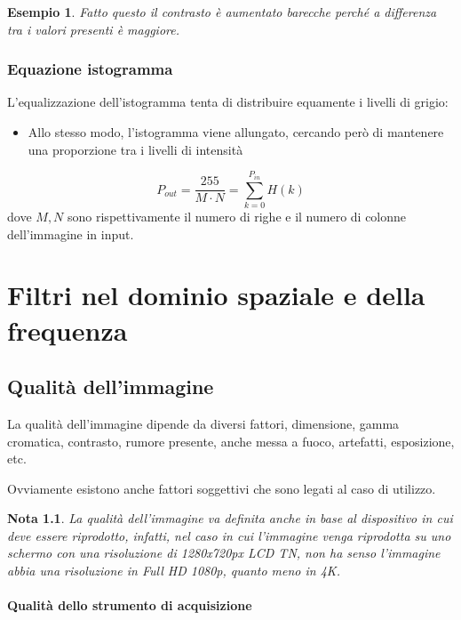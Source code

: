\documentclass{report}
\newtheorem{nota}{Nota}[section]
\newtheorem{esempio}{Esempio}[section]
\begin{document}
\begin{esempio}
  Fatto questo il contrasto è aumentato barecche perché a differenza tra
  i valori presenti è maggiore.
\end{esempio}

\subsection{Equazione istogramma}
\label{sec:eq-histo}

L'equalizzazione dell'istogramma tenta di distribuire equamente i livelli
di grigio:
\begin{itemize}
\item Allo stesso modo, l'istogramma viene allungato, cercando però di
  mantenere una proporzione tra i livelli di intensità
\end{itemize}
\begin{equation}
  \label{eq:eq-histo}
  P_{out}=\frac{255}{M\cdot N} = \sum\limits_{k=0}^{P_{in}}H(k)
\end{equation}
dove $M, N$ sono rispettivamente il numero di righe e il numero di
colonne dell'immagine in input.

\chapter{Filtri nel dominio spaziale e della frequenza}
\label{chap:filtri}

\section{Qualità dell'immagine}
\label{sec:qualità}

La qualità dell'immagine dipende da diversi fattori, dimensione,
gamma cromatica, contrasto, rumore presente, anche messa a fuoco,
artefatti, esposizione, etc.

Ovviamente esistono anche fattori soggettivi che sono legati al caso di
utilizzo.
\begin{nota}
  La qualità dell'immagine va definita anche in base al dispositivo
  in cui deve essere riprodotto, infatti, nel caso in cui l'immagine
  venga riprodotta su uno schermo con una risoluzione di 1280x720px LCD
  TN, non ha senso l'immagine abbia una risoluzione in Full HD 1080p,
  quanto meno in 4K.
\end{nota}
\subsubsection{Qualità dello strumento di acquisizione}
\label{sec:strumentodistampa}
\end{document}

